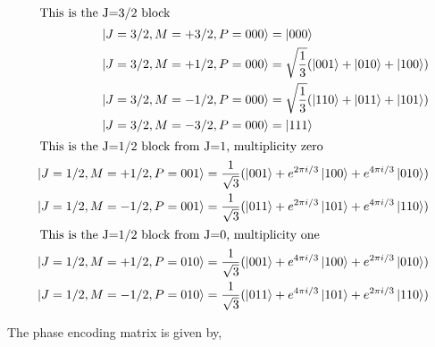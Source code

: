 \begin{subequations}
\begin{align}
\intertext{ This is the J=3/2 block}
\begin{split}
&\ket{J=3/2, M=+3/2, P=000} = \ket{000} \\
&\ket{J=3/2, M=+1/2, P=000} = \sqrt{\frac{1}{3}}(\ket{001}+\ket{010}+\ket{100}) \\
&\ket{J=3/2, M=-1/2, P=000} = \sqrt{\frac{1}{3}}(\ket{110}+\ket{011}+\ket{101}) \\
&\ket{J=3/2, M=-3/2, P=000} = \ket{111} \\ 
\end{split} \\
\intertext{ This is the J=1/2 block from J=1, multiplicity zero}
\begin{split}
&\ket{J=1/2, M=+1/2, P=001} = \frac{1}{\sqrt{3}} (\ket{001} + e^{2\pi i/3}\ket{100}+e^{4\pi i/3}\ket{010}) \\
&\ket{J=1/2, M=-1/2, P=001} =\frac{1}{\sqrt{3}} (\ket{011} + e^{2\pi i/3} \ket{101}+e^{4\pi i/3}\ket{110}) \\ 
\end{split} \\
\intertext{ This is the J=1/2 block from J=0, multiplicity one}
\begin{split}
&\ket{J=1/2, M=+1/2, P=010} = \frac{1}{\sqrt{3}} (\ket{001} + e^{4\pi i/3}\ket{100}+e^{2\pi i/3}\ket{010}) \\
&\ket{J=1/2, M=-1/2, P=010} =\frac{1}{\sqrt{3}} (\ket{011} + e^{4\pi i/3}\ket{101} +e^{2\pi i/3}\ket{110})\\
\end{split} 
\end{align}
\end{subequations}

The phase encoding matrix is given by,

